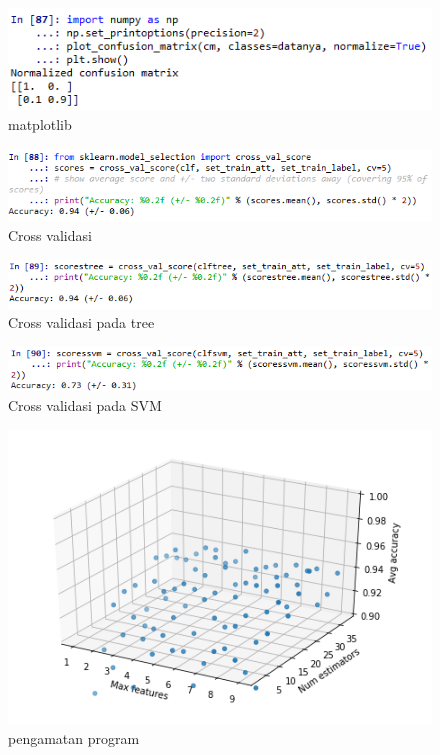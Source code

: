 \begin{figure}[!htbp]
	\centering
	\includegraphics[width=1\textwidth]{figures/fathi/chapter4/hari2/5}
	\caption{matplotlib}
	\label{b5}
\end{figure}
\begin{figure}[!htbp]
	\centering
	\includegraphics[width=1\textwidth]{figures/fathi/chapter4/hari2/6}
	\caption{Cross validasi}
	\label{b6}
\end{figure}
\begin{figure}[!htbp]
	\centering
	\includegraphics[width=1\textwidth]{figures/fathi/chapter4/hari2/7}
	\caption{Cross validasi pada tree}
	\label{b7}
\end{figure}
\begin{figure}[!htbp]
	\centering
	\includegraphics[width=1\textwidth]{figures/fathi/chapter4/hari2/8}
	\caption{Cross validasi pada SVM}
	\label{b8}
\end{figure}
\begin{figure}[!htbp]
	\centering
	\includegraphics[width=1\textwidth]{figures/fathi/chapter4/hari2/9}
	\caption{pengamatan program}
	\label{b9}
\end{figure}
